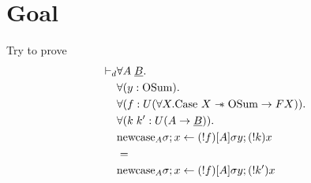 \documentclass{article}
\begin{document}
\section{Goal}
Try to prove 
\begin{align*}
    \vdash_d & \forall A \;\underline{B}. \\
    & \forall (y : \textrm{OSum}). \\
    & \forall (f : U(\forall X . \textrm{Case }X \mathrel{-\mkern-6mu*} \textrm{OSum} \rightarrow F X)). \\
    & \forall (k \; k' : U(A \rightarrow \underline{B})). \\
    & \textrm{newcase}_A \sigma ; x \leftarrow (!f)[A]\sigma y ; (!k) x  \\
    & = \\
    & \textrm{newcase}_A \sigma ; x \leftarrow (!f)[A]\sigma y ; (!k') x  
\end{align*}   
\end{document}
